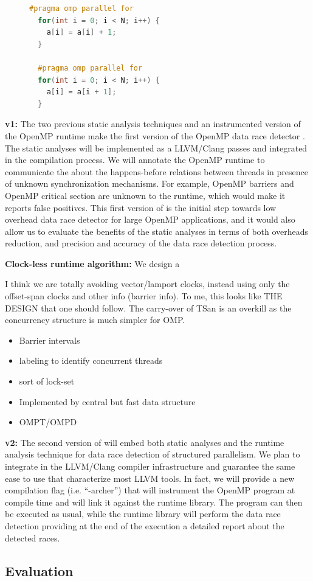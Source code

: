 \begin{figure}
  \vspace{-2ex}
  \begin{lstlisting}[language=C++, caption=OpenMP loops with and without loop-carried data dependency., label=code:example01]
  #pragma omp parallel for
  for(int i = 0; i < N; i++) {
    a[i] = a[i] + 1;
  }

  #pragma omp parallel for
  for(int i = 0; i < N; i++) {
    a[i] = a[i + 1];
  }
  \end{lstlisting}
\end{figure}

\textbf{\archer v1:} The two previous static analysis techniques and an
instrumented version of the OpenMP runtime make the first version of the
OpenMP data race detector \archer.
%
The static analyses will be implemented as a LLVM/Clang passes and integrated
in the compilation process.
%
We will annotate the OpenMP runtime to communicate the \tsan about the
happens-before relations between threads in presence of unknown
synchronization mechanisms.
%
For example, OpenMP barriers and OpenMP critical section are unknown to the
\tsan runtime, which would make it reports false positives.
%
This first version of \archer is the initial step towards low overhead data
race detector for large OpenMP applications, and it would also allow us to
evaluate the benefits of the static analyses in terms of both overheads
reduction, and precision and accuracy of the data race detection process.

\textbf{Clock-less runtime algorithm:} We design a 

I think we are totally avoiding vector/lamport clocks, instead using only the offset-span clocks and other info (barrier info). 
To me, this looks like THE DESIGN that one should follow.  The carry-over of
TSan is an overkill as the concurrency structure is much simpler for OMP.

\begin{itemize}
\item Barrier intervals
\item labeling to identify concurrent threads
\item sort of lock-set
\item Implemented by central but fast data structure
\item OMPT/OMPD
\end{itemize}

\textbf{\archer v2:} The second version of \archer will embed both static
analyses and the runtime analysis technique for data race detection of
structured parallelism.
%
We plan to integrate \archer in the LLVM/Clang compiler infrastructure and
guarantee the same ease to use that characterize most LLVM tools.
%
In fact, we will provide a new compilation flag (i.e. ``-archer'') that will
instrument the OpenMP program at compile time and will link it against the
\archer runtime library.
%
The program can then be executed as usual, while the \archer runtime library
will perform the data race detection providing at the end of the execution a
detailed report about the detected races.

\subsection{Evaluation}
\label{subsec:evaluation}

